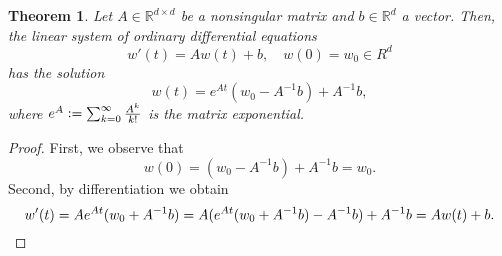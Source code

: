 \documentclass[12pt]{article}
\newtheorem{theorem}{Theorem}[section]
\theoremstyle{definition}
\numberwithin{equation}{section}
\newcommand{\R}{\mathbb{R}}
\newcommand{\defeq}{\vcentcolon=}
\begin{document}
\begin{theorem}
  \label{thm:ode_system}
  Let  $A \in \R^{d \times d}$ be a nonsingular matrix and $b \in \R^d$ a vector. Then, the linear system of ordinary differential equations
  \begin{equation*}
    w'(t) = Aw(t) + b, \quad w(0) = w_0 \in R^d
  \end{equation*}
  has the solution
  \begin{equation*}
    w(t) = e^{At}(w_0 - A^{-1}b) + A^{-1}b,
  \end{equation*}
  where $e^A \defeq \sum_{k=0}^\infty \frac{A^k}{k!}$ is the matrix exponential.
\end{theorem}
\begin{proof}
  First, we observe that
  \begin{equation*}
    w(0) = (w_0 - A^{-1}b) + A^{-1}b = w_0.
  \end{equation*}
  Second, by differentiation we obtain
  \begin{equation*}
    w'(t) = A e^{At}(w_0+A^{-1}b) = A (e^{At}(w_0+A^{-1}b) - A^{-1}b) + A^{-1}b = Aw(t) + b. \qedhere
  \end{equation*}
\end{proof}
\end{document}
